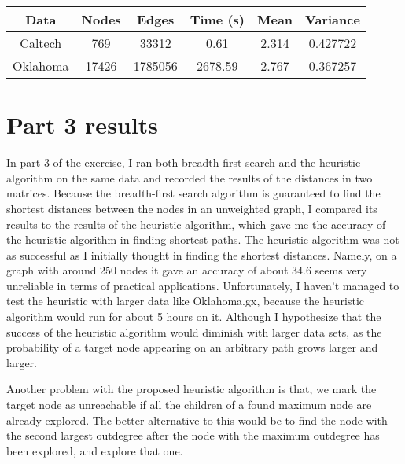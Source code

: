 \documentclass{article}
\begin{document}
\begin{center}
 \begin{tabular}{||c c c c c c||}
 \hline
 Data & Nodes & Edges & Time (s) & Mean & Variance \\ [0.5ex]
 \hline\hline
 Caltech & 769 & 33312 & 0.61 & 2.314 & 0.427722\\
 \hline
 Oklahoma & 17426 & 1785056 & 2678.59 & 2.767 & 0.367257 \\ [1ex]
 \hline
\end{tabular}
\end{center}


\section{Part 3 results}
\label{sec:part3}
In part 3 of the exercise, I ran both breadth-first search and the heuristic algorithm on the same
data and recorded the results of the distances in two matrices. Because the breadth-first search
algorithm is guaranteed to find the shortest distances between the nodes in an unweighted graph, I
compared its results to the results of the heuristic algorithm, which gave me the accuracy of the
heuristic algorithm in finding shortest paths. The heuristic algorithm was not as successful as
I initially thought in finding the shortest distances. Namely, on a graph with around 250 nodes
it gave an accuracy of about 34.6%
seems very unreliable in terms of practical applications. Unfortunately, I haven't managed to test the
heuristic with larger data like Oklahoma.gx, because the heuristic algorithm would run for about 5 hours
on it. Although I hypothesize that the success of the heuristic algorithm would diminish with larger
data sets, as the probability of a target node appearing on an arbitrary path grows larger and larger.

Another problem with the proposed heuristic algorithm is that, we mark the target node as unreachable if
all the children of a found maximum node are already explored. The better alternative to this would be to
find the node with the second largest outdegree after the node with the maximum outdegree has been explored,
and explore that one.
\end{document}
